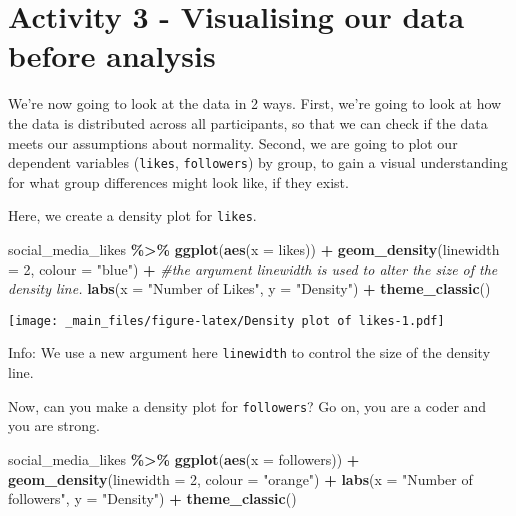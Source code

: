 \documentclass[
]{book}
\newenvironment{Shaded}{\begin{snugshade}}{\end{snugshade}}
\newcommand{\AttributeTok}[1]{\textcolor[rgb]{0.13,0.29,0.53}{#1}}
\newcommand{\CommentTok}[1]{\textcolor[rgb]{0.56,0.35,0.01}{\textit{#1}}}
\newcommand{\DecValTok}[1]{\textcolor[rgb]{0.00,0.00,0.81}{#1}}
\newcommand{\FunctionTok}[1]{\textcolor[rgb]{0.13,0.29,0.53}{\textbf{#1}}}
\newcommand{\NormalTok}[1]{#1}
\newcommand{\SpecialCharTok}[1]{\textcolor[rgb]{0.81,0.36,0.00}{\textbf{#1}}}
\newcommand{\StringTok}[1]{\textcolor[rgb]{0.31,0.60,0.02}{#1}}
\begin{document}
\section{Activity 3 - Visualising our data before analysis}\label{activity-3---visualising-our-data-before-analysis}

We're now going to look at the data in 2 ways. First, we're going to look at how the data is distributed across all participants, so that we can check if the data meets our assumptions about normality. Second, we are going to plot our dependent variables (\texttt{likes}, \texttt{followers}) by group, to gain a visual understanding for what group differences might look like, if they exist.

Here, we create a density plot for \texttt{likes}.

\begin{Shaded}
\begin{Highlighting}[]
\NormalTok{social\_media\_likes }\SpecialCharTok{\%\textgreater{}\%} 
  \FunctionTok{ggplot}\NormalTok{(}\FunctionTok{aes}\NormalTok{(}\AttributeTok{x =}\NormalTok{ likes)) }\SpecialCharTok{+}
  \FunctionTok{geom\_density}\NormalTok{(}\AttributeTok{linewidth =} \DecValTok{2}\NormalTok{, }\AttributeTok{colour =} \StringTok{"blue"}\NormalTok{) }\SpecialCharTok{+} \CommentTok{\#the argument linewidth is used to alter the size of the density line. }
  \FunctionTok{labs}\NormalTok{(}\AttributeTok{x =} \StringTok{"Number of Likes"}\NormalTok{, }\AttributeTok{y =} \StringTok{"Density"}\NormalTok{) }\SpecialCharTok{+}
  \FunctionTok{theme\_classic}\NormalTok{() }
\end{Highlighting}
\end{Shaded}

\texttt{[image: \_main\_files/figure-latex/Density plot of likes-1.pdf]}

Info: We use a new argument here \texttt{linewidth} to control the size of the density line.

Now, can you make a density plot for \texttt{followers}? Go on, you are a coder and you are strong.

\begin{Shaded}
\begin{Highlighting}[]
\NormalTok{social\_media\_likes }\SpecialCharTok{\%\textgreater{}\%} 
  \FunctionTok{ggplot}\NormalTok{(}\FunctionTok{aes}\NormalTok{(}\AttributeTok{x =}\NormalTok{ followers)) }\SpecialCharTok{+} 
  \FunctionTok{geom\_density}\NormalTok{(}\AttributeTok{linewidth =} \DecValTok{2}\NormalTok{, }\AttributeTok{colour =} \StringTok{"orange"}\NormalTok{) }\SpecialCharTok{+}
  \FunctionTok{labs}\NormalTok{(}\AttributeTok{x =} \StringTok{"Number of followers"}\NormalTok{, }\AttributeTok{y =} \StringTok{"Density"}\NormalTok{) }\SpecialCharTok{+}
  \FunctionTok{theme\_classic}\NormalTok{() }
\end{Highlighting}
\end{Shaded}
\end{document}
